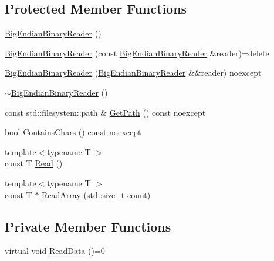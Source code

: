 \subsection*{Protected Member Functions}
\begin{DoxyCompactItemize}
\item 
\mbox{\hyperlink{classmage_1_1_big_endian_binary_reader_a1fd0dbee6950a8cb04aa399f0cdbaf2a}{Big\+Endian\+Binary\+Reader}} ()
\item 
\mbox{\hyperlink{classmage_1_1_big_endian_binary_reader_a9d490263268290217ae4f2f06e0699c4}{Big\+Endian\+Binary\+Reader}} (const \mbox{\hyperlink{classmage_1_1_big_endian_binary_reader}{Big\+Endian\+Binary\+Reader}} \&reader)=delete
\item 
\mbox{\hyperlink{classmage_1_1_big_endian_binary_reader_a16c4303dfb333ebdddfc07c924b9735a}{Big\+Endian\+Binary\+Reader}} (\mbox{\hyperlink{classmage_1_1_big_endian_binary_reader}{Big\+Endian\+Binary\+Reader}} \&\&reader) noexcept
\item 
\mbox{\hyperlink{classmage_1_1_big_endian_binary_reader_ae85a40e8ed06e8c887e38d914843b8d3}{$\sim$\+Big\+Endian\+Binary\+Reader}} ()
\item 
const std\+::filesystem\+::path \& \mbox{\hyperlink{classmage_1_1_big_endian_binary_reader_a1d21e0117af4cbf99152e4a659372364}{Get\+Path}} () const noexcept
\item 
bool \mbox{\hyperlink{classmage_1_1_big_endian_binary_reader_ac6de015b6bbcecdcef58ab074d99fb49}{Contains\+Chars}} () const noexcept
\item 
{\footnotesize template$<$typename T $>$ }\\const T \mbox{\hyperlink{classmage_1_1_big_endian_binary_reader_ac5dca9fec95723379d44e112946a352a}{Read}} ()
\item 
{\footnotesize template$<$typename T $>$ }\\const T $\ast$ \mbox{\hyperlink{classmage_1_1_big_endian_binary_reader_a3ec5205d485cdb31cc0d0fd338bfd4b6}{Read\+Array}} (std\+::size\+\_\+t count)
\end{DoxyCompactItemize}
\subsection*{Private Member Functions}
\begin{DoxyCompactItemize}
\item 
virtual void \mbox{\hyperlink{classmage_1_1_big_endian_binary_reader_a7dc0689d598fa91308597b129516a11d}{Read\+Data}} ()=0
\end{DoxyCompactItemize}
